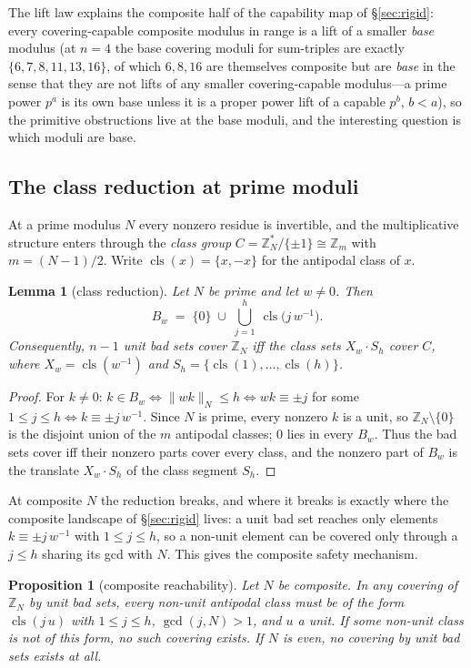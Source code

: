 \documentclass[11pt,a4paper]{article}
\numberwithin{equation}{section}
\theoremstyle{plain}
\newtheorem{lemma}[theorem]{Lemma}
\newtheorem{proposition}[theorem]{Proposition}
\theoremstyle{definition}
\theoremstyle{remark}
\newcommand{\Z}{\mathbb{Z}}
\newcommand{\wn}[1]{\lVert #1 \rVert_{N}}
\DeclareMathOperator{\cls}{cls}
\begin{document}
The lift law explains the composite half of the capability map of
\S\ref{sec:rigid}: every covering-capable composite modulus in range is a
lift of a smaller \emph{base} modulus (at $n=4$ the base covering moduli
for sum-triples are exactly $\{6,7,8,11,13,16\}$, of which $6,8,16$ are
themselves composite but are \emph{base} in the sense that they are not
lifts of any smaller covering-capable modulus---a prime power $p^a$ is its
own base unless it is a proper power lift of a capable $p^b$, $b<a$), so
the primitive obstructions live at the base moduli, and the interesting
question is which moduli are base.

\subsection{The class reduction at prime moduli}

At a prime modulus $N$ every nonzero residue is invertible, and the
multiplicative structure enters through the \emph{class group}
$C=\Z_N^\ast/\{\pm1\}\cong\Z_m$ with $m=(N-1)/2$. Write
$\cls(x)=\{x,-x\}$ for the antipodal class of $x$.

\begin{lemma}[class reduction]\label{lem:class}
Let $N$ be prime and let $w\ne 0$. Then
\[
B_w\;=\;\{0\}\;\cup\;\bigcup_{j=1}^{h}\ \cls\!\bigl(j\,w^{-1}\bigr).
\]
Consequently, $n-1$ unit bad sets cover $\Z_N$ iff the class sets
$X_w\cdot S_h$ cover $C$, where $X_w=\cls(w^{-1})$ and
$S_h=\{\cls(1),\dots,\cls(h)\}$.
\end{lemma}

\begin{proof}
For $k\ne 0$: $k\in B_w\iff \wn{wk}\le h\iff wk\equiv \pm j$ for some
$1\le j\le h\iff k\equiv \pm j\,w^{-1}$. Since $N$ is prime, every nonzero
$k$ is a unit, so $\Z_N\setminus\{0\}$ is the disjoint union of the $m$
antipodal classes; $0$ lies in every $B_w$. Thus the bad sets cover iff
their nonzero parts cover every class, and the nonzero part of $B_w$ is
the translate $X_w\cdot S_h$ of the class segment $S_h$.
\end{proof}

At composite $N$ the reduction breaks, and where it breaks is exactly
where the composite landscape of \S\ref{sec:rigid} lives: a unit bad set
reaches only elements $k\equiv\pm j\,w^{-1}$ with $1\le j\le h$, so a
non-unit element can be covered only through a $j\le h$ sharing its gcd
with $N$. This gives the composite safety mechanism.

\begin{proposition}[composite reachability]\label{prop:reach}
Let $N$ be composite. In any covering of $\Z_N$ by unit bad sets, every
non-unit antipodal class must be of the form $\cls(j\,u)$ with
$1\le j\le h$, $\gcd(j,N)>1$, and $u$ a unit. If some non-unit class is
not of this form, no such covering exists. If $N$ is even, no covering by
unit bad sets exists at all.
\end{proposition}
\end{document}
